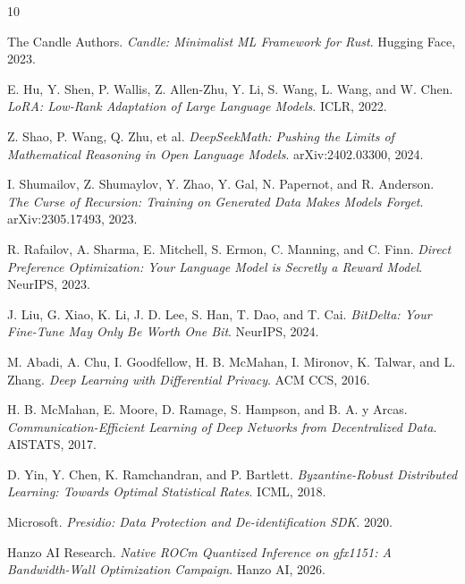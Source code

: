 \documentclass[11pt]{article}
\begin{document}
\begin{thebibliography}{10}

The Candle Authors. \textit{Candle: Minimalist ML Framework for Rust}. Hugging Face, 2023.

E. Hu, Y. Shen, P. Wallis, Z. Allen-Zhu, Y. Li, S. Wang, L. Wang, and W. Chen. \textit{LoRA: Low-Rank Adaptation of Large Language Models}. ICLR, 2022.

Z. Shao, P. Wang, Q. Zhu, et al. \textit{DeepSeekMath: Pushing the Limits of Mathematical Reasoning in Open Language Models}. arXiv:2402.03300, 2024.

I. Shumailov, Z. Shumaylov, Y. Zhao, Y. Gal, N. Papernot, and R. Anderson. \textit{The Curse of Recursion: Training on Generated Data Makes Models Forget}. arXiv:2305.17493, 2023.

R. Rafailov, A. Sharma, E. Mitchell, S. Ermon, C. Manning, and C. Finn. \textit{Direct Preference Optimization: Your Language Model is Secretly a Reward Model}. NeurIPS, 2023.

J. Liu, G. Xiao, K. Li, J. D. Lee, S. Han, T. Dao, and T. Cai. \textit{BitDelta: Your Fine-Tune May Only Be Worth One Bit}. NeurIPS, 2024.

M. Abadi, A. Chu, I. Goodfellow, H. B. McMahan, I. Mironov, K. Talwar, and L. Zhang. \textit{Deep Learning with Differential Privacy}. ACM CCS, 2016.

H. B. McMahan, E. Moore, D. Ramage, S. Hampson, and B. A. y Arcas. \textit{Communication-Efficient Learning of Deep Networks from Decentralized Data}. AISTATS, 2017.

D. Yin, Y. Chen, K. Ramchandran, and P. Bartlett. \textit{Byzantine-Robust Distributed Learning: Towards Optimal Statistical Rates}. ICML, 2018.

Microsoft. \textit{Presidio: Data Protection and De-identification SDK}. 2020.

Hanzo AI Research. \textit{Native ROCm Quantized Inference on gfx1151: A Bandwidth-Wall Optimization Campaign}. Hanzo AI, 2026.

\end{thebibliography}
\end{document}
